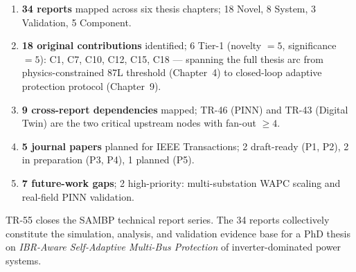 \documentclass[11pt,a4paper]{article}
\begin{document}
\begin{enumerate}
  \item \textbf{34 reports} mapped across six thesis chapters;
    18 Novel, 8 System, 3 Validation, 5 Component.

  \item \textbf{18 original contributions} identified;
    6 Tier-1 (novelty $= 5$, significance $= 5$): C1, C7, C10, C12,
    C15, C18 --- spanning the full thesis arc from physics-constrained
    87L threshold (Chapter~4) to closed-loop adaptive protection
    protocol (Chapter~9).

  \item \textbf{9 cross-report dependencies} mapped; TR-46 (PINN) and
    TR-43 (Digital Twin) are the two critical upstream nodes with
    fan-out $\geq 4$.

  \item \textbf{5 journal papers} planned for IEEE Transactions;
    2 draft-ready (P1, P2), 2 in preparation (P3, P4), 1 planned (P5).

  \item \textbf{7 future-work gaps}; 2 high-priority: multi-substation
    WAPC scaling and real-field PINN validation.
\end{enumerate}

\noindent
TR-55 closes the SAMBP technical report series.  The 34 reports
collectively constitute the simulation, analysis, and validation
evidence base for a PhD thesis on \emph{IBR-Aware Self-Adaptive
Multi-Bus Protection} of inverter-dominated power systems.



\end{document}
